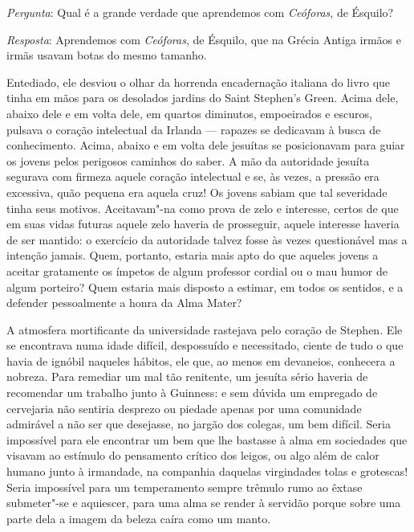 \textit{Pergunta}: Qual é a grande verdade que aprendemos com
\textit{Ceóforas}, de Ésquilo?

\textit{Resposta}: Aprendemos com \textit{Ceóforas}, de Ésquilo, que na Grécia
Antiga irmãos e irmãs usavam botas do mesmo tamanho.

Entediado, ele desviou o olhar da horrenda encadernação italiana do livro que
tinha em mãos para os desolados jardins do Saint Stephen’s Green.  Acima dele,
abaixo dele e em volta dele, em quartos diminutos, empoeirados e escuros,
pulsava o coração intelectual da Irlanda --- rapazes se dedicavam à busca de
conhecimento.  Acima, abaixo e em volta dele jesuítas se posicionavam para
guiar os jovens pelos perigosos caminhos do saber.  A mão da autoridade jesuíta
segurava com firmeza aquele coração intelectual e se, às vezes, a pressão era
excessiva, quão pequena era aquela cruz!  Os jovens sabiam que tal severidade
tinha seus motivos.  Aceitavam"-na como prova de zelo e interesse, certos de que
em suas vidas futuras aquele zelo haveria de prosseguir, aquele interesse
haveria de ser mantido: o exercício da autoridade talvez fosse às vezes
questionável mas a intenção jamais.  Quem, portanto, estaria mais
apto do que aqueles jovens a aceitar gratamente os ímpetos de algum professor
cordial ou o mau humor de algum porteiro?  Quem estaria mais disposto a
estimar, em todos os sentidos, e a defender pessoalmente a honra da Alma Mater?

A atmosfera mortificante da universidade rastejava pelo coração de Stephen.
Ele se encontrava numa idade difícil, despossuído e necessitado, ciente de tudo
o que havia de ignóbil naqueles hábitos, ele que, ao menos em devaneios,
conhecera a nobreza.  Para remediar um mal tão renitente, um jesuíta sério
haveria de recomendar um trabalho junto à Guinness: e sem
dúvida um empregado de cervejaria não sentiria desprezo ou piedade apenas por
uma comunidade admirável a não ser que desejasse, no jargão dos colegas, um bem
difícil.  Seria impossível para ele encontrar um bem que lhe bastasse à alma em
sociedades que visavam ao estímulo do pensamento crítico dos leigos, ou algo
além de calor humano junto à irmandade, na companhia daquelas virgindades tolas
e grotescas!  Seria impossível para um temperamento sempre trêmulo rumo ao
êxtase submeter"-se e aquiescer, para uma alma se render à servidão porque sobre
uma parte dela a imagem da beleza caíra como um manto.

